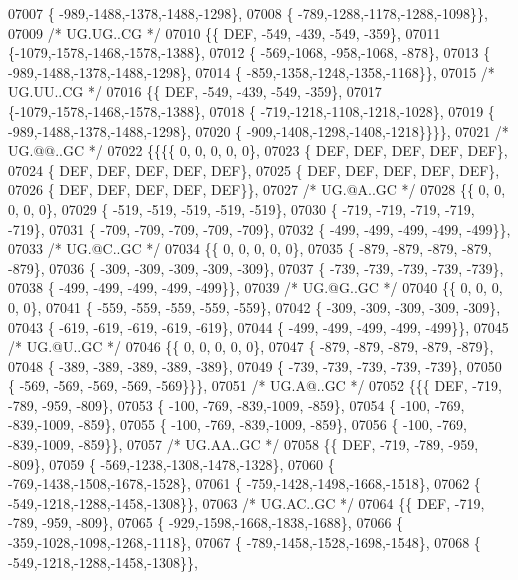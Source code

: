 \begin{DoxyCode}
07007 \{ -989,-1488,-1378,-1488,-1298\},
07008 \{ -789,-1288,-1178,-1288,-1098\}\},
07009 \textcolor{comment}{/* UG.UG..CG */}
07010 \{\{  DEF, -549, -439, -549, -359\},
07011 \{-1079,-1578,-1468,-1578,-1388\},
07012 \{ -569,-1068, -958,-1068, -878\},
07013 \{ -989,-1488,-1378,-1488,-1298\},
07014 \{ -859,-1358,-1248,-1358,-1168\}\},
07015 \textcolor{comment}{/* UG.UU..CG */}
07016 \{\{  DEF, -549, -439, -549, -359\},
07017 \{-1079,-1578,-1468,-1578,-1388\},
07018 \{ -719,-1218,-1108,-1218,-1028\},
07019 \{ -989,-1488,-1378,-1488,-1298\},
07020 \{ -909,-1408,-1298,-1408,-1218\}\}\}\},
07021 \textcolor{comment}{/* UG.@@..GC */}
07022 \{\{\{\{    0,    0,    0,    0,    0\},
07023 \{  DEF,  DEF,  DEF,  DEF,  DEF\},
07024 \{  DEF,  DEF,  DEF,  DEF,  DEF\},
07025 \{  DEF,  DEF,  DEF,  DEF,  DEF\},
07026 \{  DEF,  DEF,  DEF,  DEF,  DEF\}\},
07027 \textcolor{comment}{/* UG.@A..GC */}
07028 \{\{    0,    0,    0,    0,    0\},
07029 \{ -519, -519, -519, -519, -519\},
07030 \{ -719, -719, -719, -719, -719\},
07031 \{ -709, -709, -709, -709, -709\},
07032 \{ -499, -499, -499, -499, -499\}\},
07033 \textcolor{comment}{/* UG.@C..GC */}
07034 \{\{    0,    0,    0,    0,    0\},
07035 \{ -879, -879, -879, -879, -879\},
07036 \{ -309, -309, -309, -309, -309\},
07037 \{ -739, -739, -739, -739, -739\},
07038 \{ -499, -499, -499, -499, -499\}\},
07039 \textcolor{comment}{/* UG.@G..GC */}
07040 \{\{    0,    0,    0,    0,    0\},
07041 \{ -559, -559, -559, -559, -559\},
07042 \{ -309, -309, -309, -309, -309\},
07043 \{ -619, -619, -619, -619, -619\},
07044 \{ -499, -499, -499, -499, -499\}\},
07045 \textcolor{comment}{/* UG.@U..GC */}
07046 \{\{    0,    0,    0,    0,    0\},
07047 \{ -879, -879, -879, -879, -879\},
07048 \{ -389, -389, -389, -389, -389\},
07049 \{ -739, -739, -739, -739, -739\},
07050 \{ -569, -569, -569, -569, -569\}\}\},
07051 \textcolor{comment}{/* UG.A@..GC */}
07052 \{\{\{  DEF, -719, -789, -959, -809\},
07053 \{ -100, -769, -839,-1009, -859\},
07054 \{ -100, -769, -839,-1009, -859\},
07055 \{ -100, -769, -839,-1009, -859\},
07056 \{ -100, -769, -839,-1009, -859\}\},
07057 \textcolor{comment}{/* UG.AA..GC */}
07058 \{\{  DEF, -719, -789, -959, -809\},
07059 \{ -569,-1238,-1308,-1478,-1328\},
07060 \{ -769,-1438,-1508,-1678,-1528\},
07061 \{ -759,-1428,-1498,-1668,-1518\},
07062 \{ -549,-1218,-1288,-1458,-1308\}\},
07063 \textcolor{comment}{/* UG.AC..GC */}
07064 \{\{  DEF, -719, -789, -959, -809\},
07065 \{ -929,-1598,-1668,-1838,-1688\},
07066 \{ -359,-1028,-1098,-1268,-1118\},
07067 \{ -789,-1458,-1528,-1698,-1548\},
07068 \{ -549,-1218,-1288,-1458,-1308\}\},

\end{DoxyCode}
